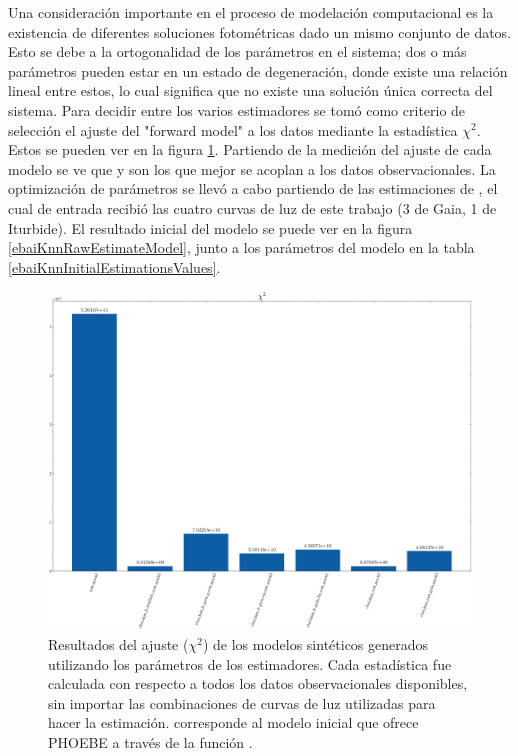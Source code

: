 Una consideración importante en el proceso de modelación computacional es la
existencia de diferentes soluciones fotométricas dado un mismo conjunto de
datos. Esto se debe a la ortogonalidad de los parámetros en el sistema; dos o
más parámetros pueden estar en un estado de degeneración, donde existe una
relación lineal entre estos, lo cual significa que no existe una solución única
correcta del sistema. Para decidir entre los varios estimadores se tomó como
criterio de selección el ajuste del "forward model" a los datos mediante la
estadística $\chi^2$. Estos se pueden ver en la figura \ref{chiSqrdFigure}.
Partiendo de la medición del ajuste de cada modelo se ve que
 y  son los que mejor se
acoplan a los datos observacionales. La optimización de parámetros se llevó a
cabo partiendo de las estimaciones de , el cual de entrada
recibió las cuatro curvas de luz de este trabajo (3 de Gaia, 1 de Iturbide). El
resultado inicial del modelo se puede ver en la figura
\ref{ebaiKnnRawEstimateModel}, junto a los parámetros del modelo en la tabla \ref{ebaiKnnInitialEstimationsValues}.

\begin{figure}[!ht]
	\centering
	\includegraphics[scale=0.43]{Metodologia/Secciones/ModeloComputacional/Figures/EstimadoresChiResultados.png}
	
	\caption{Resultados del ajuste ($\chi^2$) de los modelos sintéticos generados
	utilizando los parámetros de los estimadores. Cada estadística fue calculada
	con respecto a todos los datos observacionales disponibles, sin importar las
	combinaciones de curvas de luz utilizadas para hacer la estimación.
	 corresponde al modelo inicial que ofrece PHOEBE a través de
	la función .} 
	\label{chiSqrdFigure}
\end{figure}

